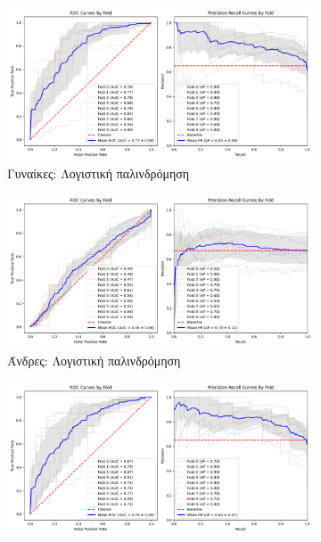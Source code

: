 \documentclass[12pt]{report}
\begin{document}
                \begin{figure}[H]
                    \centering
                    \begin{subfigure}[b]{0.48\textwidth}
                        \includegraphics[width=\textwidth]{ML/CV/stratified_Female_50-70_LR_useSMOTE_False_k_fold_validation.png}
                        \caption{Γυναίκες: Λογιστική παλινδρόμηση}
                        \label{stratified_Female_50-70_LR_useSMOTE_False_k_fold_validation}
                    \end{subfigure}
                    \hfill
                    \begin{subfigure}[b]{0.48\textwidth}
                        \includegraphics[width=\textwidth]{ML/CV/stratified_Male_50-70_LR_useSMOTE_False_k_fold_validation.png}
                        \caption{Άνδρες: Λογιστική παλινδρόμηση}
                        \label{stratified_Male_50-70_LR_useSMOTE_False_k_fold_validation}
                    \end{subfigure}
                    \vspace{0.5cm}
                    \begin{subfigure}[b]{0.48\textwidth}
                        \includegraphics[width=\textwidth]{ML/CV/stratified_Female_50-70_SVM_useSMOTE_False_k_fold_validation.png}

\end{subfigure}
\end{figure}
\end{document}
